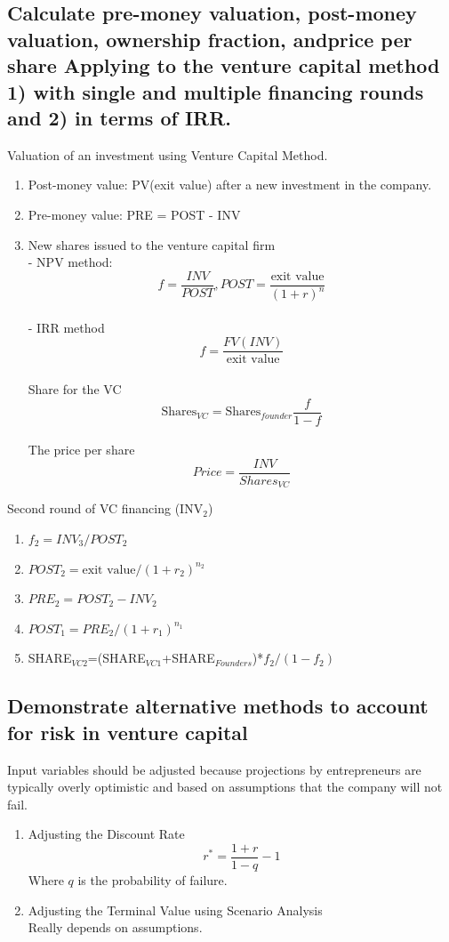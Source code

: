 \documentclass{article}
\newcommand{\be}{\begin{enumerate}}
\newcommand{\ee}{\end{enumerate}}
\begin{document}
\subsection{Calculate pre-money valuation, post-money valuation, ownership fraction, andprice per share Applying
to the venture capital method 1) with single and multiple financing rounds and 2) in terms of IRR.}
Valuation of an investment using Venture Capital Method.
\be
    \item Post-money value: PV(exit value) after a new investment in the company.
    \item Pre-money value: PRE = POST - INV
    \item New shares issued to the venture capital firm
        \\- NPV method:
        $$
            f=\frac{INV}{POST}, POST = \frac{\text{exit value}}{(1+r)^n}
        $$
        \\- IRR method
         $$
            f=\frac{FV(INV)}{\text{exit value}}
        $$ 
        \\ Share for the VC
        $$
            \text{Shares}_{VC}=\text{Shares}_{founder}\frac{f}{1-f}
        $$
        \\ The price per share
        $$
            Price =\frac{INV}{Shares_{VC}}
        $$
\ee
Second round of VC financing (INV$_2$)
\be
    \item $f_2 = INV_3/POST_2$
    \item $POST_2 = \text{exit value}/(1+r_2)^{n_2}$
    \item $PRE_2=POST_2-INV_2$
    \item $POST_1=PRE_2/(1+r_1)^{n_1}$
    \item SHARE$_{VC2}$=(SHARE$_{VC1}$+SHARE$_{Founders}$)*$f_2/(1-f_2)$

\ee
\subsection{Demonstrate alternative methods to account for risk in venture capital}
Input variables should be adjusted because projections by entrepreneurs 
are typically overly optimistic and based on assumptions that the company will not fail.
\be
    \item Adjusting the Discount Rate
    $$
        r^*=\frac{1+r}{1-q}-1
    $$
    Where $q$ is the probability of failure.
    \item Adjusting the Terminal Value using Scenario Analysis
    \\Really depends on assumptions.
\ee
\end{document}
